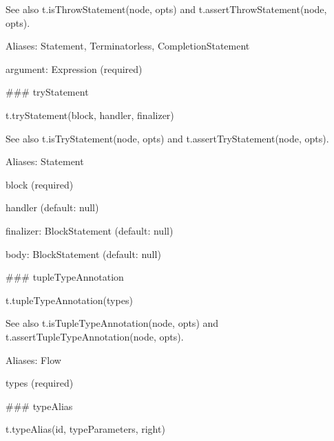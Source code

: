See also {\ttfamily t.\+is\+Throw\+Statement(node, opts)} and {\ttfamily t.\+assert\+Throw\+Statement(node, opts)}.

Aliases\+: {\ttfamily Statement}, {\ttfamily Terminatorless}, {\ttfamily Completion\+Statement}


\begin{DoxyItemize}
\item {\ttfamily argument}\+: {\ttfamily Expression} (required) 


\end{DoxyItemize}

\#\#\# try\+Statement 
\begin{DoxyCode}
t.tryStatement(block, handler, finalizer)
\end{DoxyCode}


See also {\ttfamily t.\+is\+Try\+Statement(node, opts)} and {\ttfamily t.\+assert\+Try\+Statement(node, opts)}.

Aliases\+: {\ttfamily Statement}


\begin{DoxyItemize}
\item {\ttfamily block} (required)
\item {\ttfamily handler} (default\+: {\ttfamily null})
\item {\ttfamily finalizer}\+: {\ttfamily Block\+Statement} (default\+: {\ttfamily null})
\item {\ttfamily body}\+: {\ttfamily Block\+Statement} (default\+: {\ttfamily null}) 


\end{DoxyItemize}

\#\#\# tuple\+Type\+Annotation 
\begin{DoxyCode}
t.tupleTypeAnnotation(types)
\end{DoxyCode}


See also {\ttfamily t.\+is\+Tuple\+Type\+Annotation(node, opts)} and {\ttfamily t.\+assert\+Tuple\+Type\+Annotation(node, opts)}.

Aliases\+: {\ttfamily Flow}


\begin{DoxyItemize}
\item {\ttfamily types} (required) 


\end{DoxyItemize}

\#\#\# type\+Alias 
\begin{DoxyCode}
t.typeAlias(id, typeParameters, right)
\end{DoxyCode}


